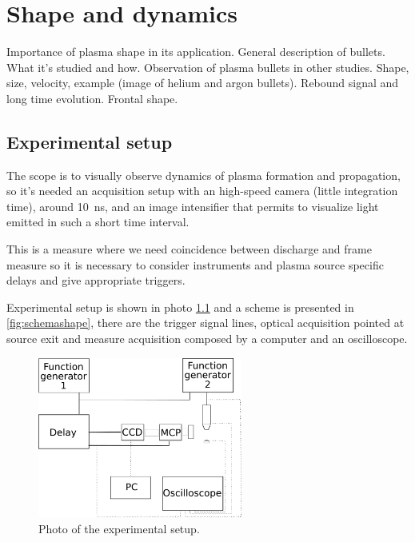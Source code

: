 \chapter{Shape and dynamics}
\label{ch:forma}
Importance of plasma shape in its application. General description of bullets.
What it's studied and how.
Observation of plasma bullets in other studies. Shape, size, velocity, example (image of helium and argon bullets). Rebound signal and long time evolution. Frontal shape.


\section{Experimental setup}
The scope is to visually observe dynamics of plasma formation and propagation, so it's needed an acquisition setup with an high-speed camera (little integration time), around \SI{10}{\nano\second}, and an image intensifier that permits to visualize light emitted in such a short time interval.

This is a measure where we need coincidence between discharge and frame measure so it is necessary to consider instruments and plasma source specific delays and give appropriate triggers.

Experimental setup is shown in photo \ref{fig:fotosetup} and a scheme is presented in \ref{fig:schemashape}, there are the trigger signal lines, optical acquisition pointed at source exit and measure acquisition composed by a computer and an oscilloscope. 
\begin{figure}
 \centering
 \includegraphics[width=0.6\textwidth]{Images/Shape/acq_ottica.png}
 \caption{Photo of the experimental setup.}
 \label{fig:fotosetup}
\end{figure}


